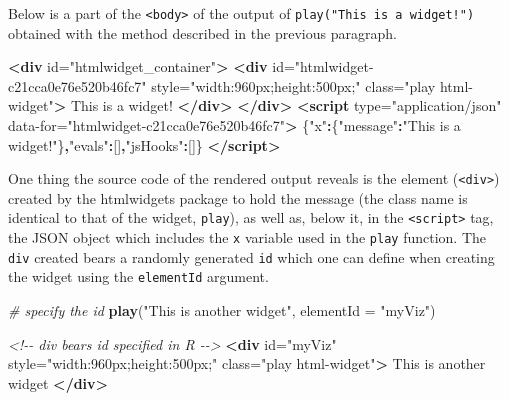 \documentclass[
]{krantz}
\makeatletter
\newenvironment{Shaded}{\begin{snugshade}}{\end{snugshade}}
\newcommand{\CommentTok}[1]{\textcolor[rgb]{0.37,0.37,0.37}{\textit{#1}}}
\newcommand{\DataTypeTok}[1]{\textcolor[rgb]{0.27,0.27,0.27}{#1}}
\newcommand{\KeywordTok}[1]{\textcolor[rgb]{0.27,0.27,0.27}{\textbf{#1}}}
\newcommand{\NormalTok}[1]{#1}
\newcommand{\OperatorTok}[1]{\textcolor[rgb]{0.43,0.43,0.43}{\textbf{#1}}}
\newcommand{\OtherTok}[1]{\textcolor[rgb]{0.37,0.37,0.37}{#1}}
\newcommand{\StringTok}[1]{\textcolor[rgb]{0.5,0.5,0.5}{#1}}
\newenvironment{kframe}{%
\medskip{}
\setlength{\fboxsep}{.8em}
 \def\at@end@of@kframe{}%
 \ifinner\ifhmode%
  \def\at@end@of@kframe{\end{minipage}}%
  \begin{minipage}{\columnwidth}%
 \fi\fi%
 \def\FrameCommand##1{\hskip\@totalleftmargin \hskip-\fboxsep
 \colorbox{shadecolor}{##1}\hskip-\fboxsep
     \hskip-\linewidth \hskip-\@totalleftmargin \hskip\columnwidth}%
 \MakeFramed {\advance\hsize-\width
   \@totalleftmargin\z@ \linewidth\hsize
   \@setminipage}}%
 {\par\unskip\endMakeFramed%
 \at@end@of@kframe}
\renewenvironment{Shaded}{\begin{kframe}}{\end{kframe}}
\makeatother
\begin{document}
Below is a part of the \texttt{\textless{}body\textgreater{}} of the output of \texttt{play("This\ is\ a\ widget!")} obtained with the method described in the previous paragraph.

\begin{Shaded}
\begin{Highlighting}[]
\KeywordTok{\textless{}div}\OtherTok{ id=}\StringTok{"htmlwidget\_container"}\KeywordTok{\textgreater{}}
  \KeywordTok{\textless{}div} 
\OtherTok{    id=}\StringTok{"htmlwidget{-}c21cca0e76e520b46fc7"} 
\OtherTok{    style=}\StringTok{"width:960px;height:500px;"} 
\OtherTok{    class=}\StringTok{"play html{-}widget"}\KeywordTok{\textgreater{}}
\NormalTok{    This is a widget!}
  \KeywordTok{\textless{}/div\textgreater{}}
\KeywordTok{\textless{}/div\textgreater{}}
\KeywordTok{\textless{}script} 
\OtherTok{  type=}\StringTok{"application/json"} 
\OtherTok{  data{-}for=}\StringTok{"htmlwidget{-}c21cca0e76e520b46fc7"}\KeywordTok{\textgreater{}}
\NormalTok{  \{}\StringTok{"x"}\OperatorTok{:}\NormalTok{\{}\StringTok{"message"}\OperatorTok{:}\StringTok{"This is a widget!"}\NormalTok{\}}\OperatorTok{,}\StringTok{"evals"}\OperatorTok{:}\NormalTok{[]}\OperatorTok{,}\StringTok{"jsHooks"}\OperatorTok{:}\NormalTok{[]\}}
\KeywordTok{\textless{}/script\textgreater{}}
\end{Highlighting}
\end{Shaded}

One thing the source code of the rendered output reveals is the element (\texttt{\textless{}div\textgreater{}}) created by the htmlwidgets package to hold the message (the class name is identical to that of the widget, \texttt{play}), as well as, below it, in the \texttt{\textless{}script\textgreater{}} tag, the JSON object which includes the \texttt{x} variable used in the \texttt{play} function. The \texttt{div} created bears a randomly generated \texttt{id} which one can define when creating the widget using the \texttt{elementId} argument.

\begin{Shaded}
\begin{Highlighting}[]
\CommentTok{\# specify the id}
\KeywordTok{play}\NormalTok{(}\StringTok{"This is another widget"}\NormalTok{, }\DataTypeTok{elementId =} \StringTok{"myViz"}\NormalTok{)}
\end{Highlighting}
\end{Shaded}

\begin{Shaded}
\begin{Highlighting}[]
\CommentTok{\textless{}!{-}{-} div bears id specified in R {-}{-}\textgreater{}}
\KeywordTok{\textless{}div}\OtherTok{ id=}\StringTok{"myViz"} 
\OtherTok{  style=}\StringTok{"width:960px;height:500px;"} 
\OtherTok{  class=}\StringTok{"play html{-}widget"}\KeywordTok{\textgreater{}}
\NormalTok{  This is another widget}
\KeywordTok{\textless{}/div\textgreater{}}
\end{Highlighting}
\end{Shaded}
\end{document}
